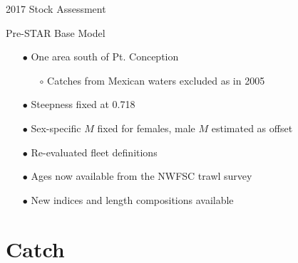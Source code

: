 \documentclass[ignorenonframetext,]{beamer}
\begin{document}
\begin{frame}{2017 Stock Assessment}

Pre-STAR Base Model

\begin{itemize}
\item[$\bullet$] One area south of Pt. Conception 
\begin{itemize}
\item[$\circ$] Catches from Mexican waters excluded as in 2005
\end{itemize}
\item[$\bullet$] Steepness fixed at 0.718
\item[$\bullet$] Sex-specific $M$ fixed for females, male $M$ estimated as offset
\item[$\bullet$] Re-evaluated fleet definitions
\item[$\bullet$] Ages now available from the NWFSC trawl survey
\item[$\bullet$] New indices and length compositions available
\end{itemize}

\end{frame}

\section{Catch}\label{catch}
\end{document}
